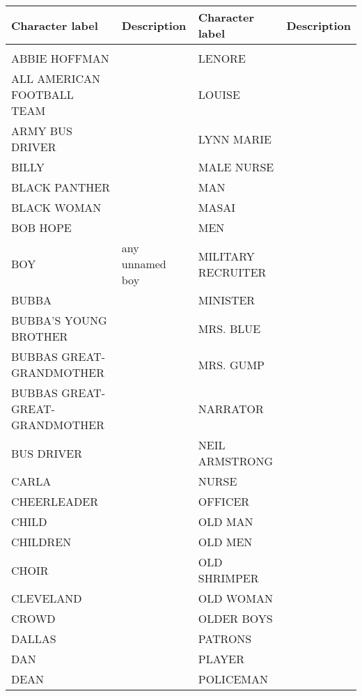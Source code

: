 \begin{table}
  \centering
  \begin{tabular}{p{4cm}p{4cm}p{4cm}p{4cm}}
 Character label & Description & Character label & Description \\
 \hline\\
 ABBIE HOFFMAN & &                            LENORE & \\
 ALL AMERICAN FOOTBALL TEAM & &               LOUISE & \\
 ARMY BUS DRIVER & &                          LYNN MARIE & \\
 BILLY & &                                    MALE NURSE & \\
 BLACK PANTHER & &                            MAN & \\
 BLACK WOMAN & &                              MASAI & \\
 BOB HOPE & &                                 MEN & \\
 BOY & any unnamed boy &                                      MILITARY RECRUITER & \\
 BUBBA & &                                    MINISTER & \\
 BUBBA'S YOUNG BROTHER & &                    MRS. BLUE & \\
 BUBBAS GREAT-GRANDMOTHER & &                 MRS. GUMP & \\
 BUBBAS GREAT-GREAT-GRANDMOTHER & &           NARRATOR & \\
 BUS DRIVER & &                               NEIL ARMSTRONG & \\
 CARLA & &                                    NURSE & \\
 CHEERLEADER & &                              OFFICER & \\
 CHILD & &                                    OLD MAN & \\
 CHILDREN & &                                 OLD MEN & \\
 CHOIR & &                                    OLD SHRIMPER & \\
 CLEVELAND & &                                OLD WOMAN & \\
 CROWD & &                                    OLDER BOYS & \\
 DALLAS & &                                   PATRONS & \\
 DAN & &                                      PLAYER & \\
 DEAN & &                                     POLICEMAN & \\

\end{tabular}
\end{table}

